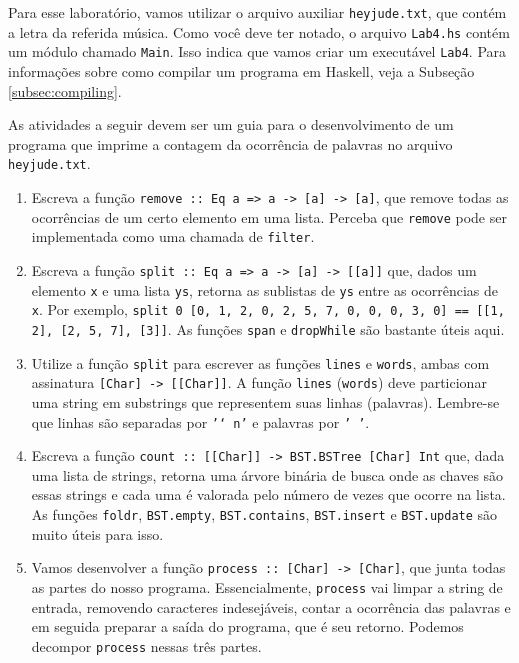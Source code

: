 \documentclass[a4paper]{article}
\begin{document}
Para esse laboratório, vamos utilizar o arquivo auxiliar \texttt{heyjude.txt}, que contém a letra da referida música.
Como você deve ter notado, o arquivo \texttt{Lab4.hs} contém um módulo chamado \texttt{Main}.
Isso indica que vamos criar um executável \texttt{Lab4}.
Para informações sobre como compilar um programa em Haskell, veja a Subseção \ref{subsec:compiling}.

As atividades a seguir devem ser um guia para o desenvolvimento de um programa que imprime a contagem da ocorrência de palavras no arquivo \texttt{heyjude.txt}.

\begin{enumerate}
	\item
		Escreva a função \texttt{remove :: Eq a => a -> [a] -> [a]}, que remove todas as ocorrências de um certo elemento em uma lista.
		Perceba que \texttt{remove} pode ser implementada como uma chamada de \texttt{filter}.
	\item
		Escreva a função \texttt{split :: Eq a => a -> [a] -> [[a]]} que, dados um elemento \texttt{x} e uma lista \texttt{ys}, retorna as sublistas de \texttt{ys} entre as ocorrências de \texttt{x}. Por exemplo, \texttt{split 0 [0, 1, 2, 0, 2, 5, 7, 0, 0, 0, 3, 0] == [[1, 2], [2, 5, 7], [3]]}.
		As funções \texttt{span} e \texttt{dropWhile} são bastante úteis aqui.
	\item
		Utilize a função \texttt{split} para escrever as funções \texttt{lines} e \texttt{words}, ambas com assinatura \texttt{[Char] -> [[Char]]}.
		A função \texttt{lines} (\texttt{words}) deve particionar uma string em substrings que representem suas linhas (palavras).
		Lembre-se que linhas são separadas por \texttt{'\char`\\n'} e palavras por \texttt{' '}.
	\item
		Escreva a função \texttt{count :: [[Char]] -> BST.BSTree [Char] Int} que, dada uma lista de strings, retorna uma árvore binária de busca onde as chaves são essas strings e cada uma é valorada pelo número de vezes que ocorre na lista.
		As funções \texttt{foldr}, \texttt{BST.empty}, \texttt{BST.contains}, \texttt{BST.insert} e \texttt{BST.update} são muito úteis para isso.
	\item
		Vamos desenvolver a função \texttt{process :: [Char] -> [Char]}, que junta todas as partes do nosso programa.
		Essencialmente, \texttt{process} vai limpar a string de entrada, removendo caracteres indesejáveis, contar a ocorrência das palavras e em seguida preparar a saída do programa, que é seu retorno.
		Podemos decompor \texttt{process} nessas três partes.

\end{enumerate}
\end{document}
